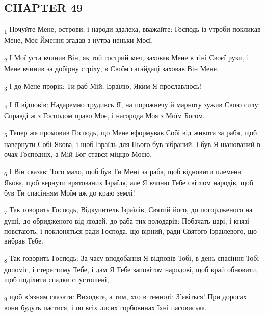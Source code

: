 \subsection{CHAPTER 49}
\begin{tcolorbox}
\textsubscript{1} Почуйте Мене, острови, і народи здалека, вважайте: Господь із утроби покликав Мене, Моє Ймення згадав з нутра неньки Моєї.
\end{tcolorbox}
\begin{tcolorbox}
\textsubscript{2} І Мої уста вчинив Він, як той гострий меч, заховав Мене в тіні Своєї руки, і Мене вчинив за добірну стрілу, в Своїм сагайдаці заховав Він Мене.
\end{tcolorbox}
\begin{tcolorbox}
\textsubscript{3} І до Мене прорік: Ти раб Мій, Ізраїлю, Яким Я прославлюсь!
\end{tcolorbox}
\begin{tcolorbox}
\textsubscript{4} І Я відповів: Надаремно трудивсь Я, на порожнечу й марноту зужив Свою силу: Справді ж з Господом право Моє, і нагорода Моя з Моїм Богом.
\end{tcolorbox}
\begin{tcolorbox}
\textsubscript{5} Тепер же промовив Господь, що Мене вформував Собі від живота за раба, щоб навернути Собі Якова, і щоб Ізраїль для Нього був зібраний. І був Я шанований в очах Господніх, а Мій Бог стався міццю Моєю.
\end{tcolorbox}
\begin{tcolorbox}
\textsubscript{6} І Він сказав: Того мало, щоб був Ти Мені за раба, щоб відновити племена Якова, щоб вернути врятованих Ізраїля, але Я вчиню Тебе світлом народів, щоб був Ти спасінням Моїм аж до краю землі!
\end{tcolorbox}
\begin{tcolorbox}
\textsubscript{7} Так говорить Господь, Відкупитель Ізраїлів, Святий його, до погордженого на душі, до обридженого від людей, до раба тих володарів: Побачать царі, і князі повстають, і поклоняться ради Господа, що вірний, ради Святого Ізраїлевого, що вибрав Тебе.
\end{tcolorbox}
\begin{tcolorbox}
\textsubscript{8} Так говорить Господь: За часу вподобання Я відповів Тобі, в день спасіння Тобі допоміг, і стерегтиму Тебе, і дам Я Тебе заповітом народові, щоб край обновити, щоб поділити спадки спустошені,
\end{tcolorbox}
\begin{tcolorbox}
\textsubscript{9} щоб в'язням сказати: Виходьте, а тим, хто в темноті: З'явіться! При дорогах вони будуть пастися, і по всіх лисих горбовинах їхні пасовиська.
\end{tcolorbox}
